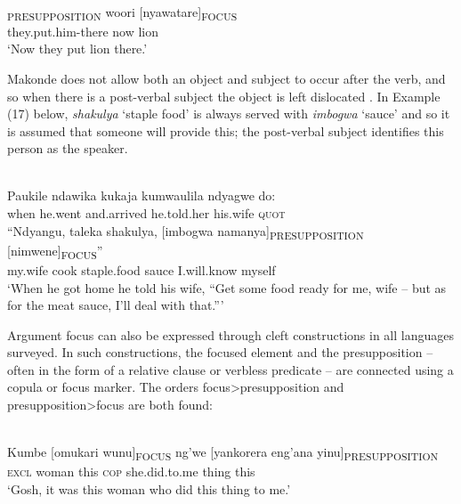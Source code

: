 \documentclass[output=paper]{langsci/langscibook}
\begin{document}
\ea\label{ex:}
\\
\gll [Mbamuta-ko]\textsubscript{PRESUPPOSITION} woori [nyawatare]\textsubscript{FOCUS}\\
they.put.him-there now lion\\


\glt \textup{‘}\textup{Now they put lion there.’}
\z

Makonde does not allow both an object and subject to occur after the verb, and so when there is a post-verbal subject the object is left dislocated \citep[91]{Leach2015}. In Example (17) below, \textit{shakulya} ‘staple food’ is always served with \textit{imbogwa} ‘sauce’ and so it is assumed that someone will provide this; the post-verbal subject identifies this person as the speaker.

\ea\label{ex:}
\\
\gll Paukile ndawika kukaja kumwaulila ndyagwe do:\\
when he.went and.arrived he.told.her his.wife \textsc{quot}\\


\gll “Ndyangu, taleka shakulya, [imbogwa namanya]\textsubscript{PRESUPPOSITION} [nimwene]\textsubscript{FOCUS}”\\
my.wife cook staple.food sauce I.will.know myself\\


\glt \textup{‘When he got home he told his wife,}\textup{ “Get some food ready for me, wife – but as for the meat sauce, I’ll deal with that.”}\textup{’}
\z

Argument focus can also be expressed through cleft constructions in all languages surveyed. In such constructions, the focused element and the presupposition – often in the form of a relative clause or verbless predicate – are connected using a copula or focus marker. The orders focus{\textgreater}presupposition and presupposition{\textgreater}focus are both found:

\ea\label{ex:}
\\
\gll Kumbe [omukari wunu]\textsubscript{FOCUS} ng’we [yankorera eng’ana yinu]\textsubscript{PRE}\textsubscript{SUPPOSITION}\\
\textsc{excl} woman this \textsc{cop} she.did.to.me thing this\\


\upshape
‘Gosh, it was this woman who did this thing to me.’
\z
\end{document}
